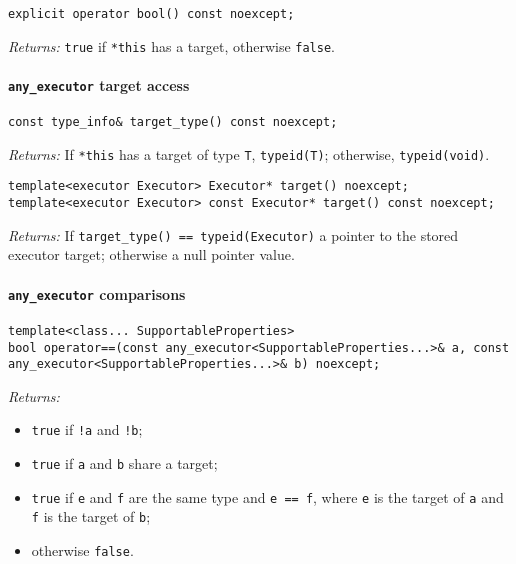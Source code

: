 \documentclass[a4paper,12pt,notitlepage,twoside,openright]{article}
\begin{document}
\begin{verbatim}
explicit operator bool() const noexcept;
\end{verbatim}

\emph{Returns:} \texttt{true} if \texttt{*this}
has a target, otherwise \texttt{false}.

\hypertarget{any_executor-target-access}{%
\paragraph{\texorpdfstring{\texttt{any_executor} target
access}{ target access}}\label{any_executor-target-access}}

\begin{verbatim}
const type_info& target_type() const noexcept;
\end{verbatim}

\emph{Returns:} If \texttt{*this} has a target of type
\texttt{T}, \texttt{typeid(T)}; otherwise,
\texttt{typeid(void)}.

\begin{verbatim}
template<executor Executor> Executor* target() noexcept;
template<executor Executor> const Executor* target() const noexcept;
\end{verbatim}

\emph{Returns:} If
\texttt{target_type() == typeid(Executor)} a pointer to the
stored executor target; otherwise a null pointer value.

\hypertarget{any_executor-comparisons}{%
\paragraph{\texorpdfstring{\texttt{any_executor}
comparisons}{ comparisons}}\label{any_executor-comparisons}}

\begin{verbatim}
template<class... SupportableProperties>
bool operator==(const any_executor<SupportableProperties...>& a, const any_executor<SupportableProperties...>& b) noexcept;
\end{verbatim}

\emph{Returns:}

\begin{itemize}

\item
  \texttt{true} if \texttt{!a} and
  \texttt{!b};
\item
  \texttt{true} if \texttt{a} and
  \texttt{b} share a target;
\item
  \texttt{true} if \texttt{e} and
  \texttt{f} are the same type and
  \texttt{e == f}, where \texttt{e} is the
  target of \texttt{a} and \texttt{f} is the
  target of \texttt{b};
\item
  otherwise \texttt{false}.
\end{itemize}
\end{document}
